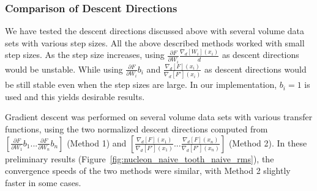 \subsubsection{Comparison of Descent Directions}
We have tested the descent directions discussed above with several volume data sets with various step sizes.
All the above described methods worked with small step sizes. As the step size increases, using $ \frac{\partial F}{\partial W_{i}} \frac{\nabla_{d}[W_{i}](x_{i})}{d} $ as descent directions would be unstable. While using $ \frac{\partial F}{\partial W_{i}} b_{i} $ and $ \frac{ \nabla_{d}[F](x_{i}) }{ \nabla_{d}[F'](x_{i}) } $ as descent directions would be still stable even when the step sizes are large. In our implementation, $ b_{i}=1 $ is used and this yields desirable results.

Gradient descent was performed on several volume data sets with various transfer functions, using the two normalized descent directions computed from $ [ \frac{\partial F}{\partial W_{1}} b_{1} ... \frac{\partial F}{\partial W_{n}} b_{n} ] $ (Method 1)
 and 
$ [ \frac{ \nabla_{d}[F](x_{1}) }{ \nabla_{d}[F'](x_{1}) }  ... \frac{ \nabla_{d}[F](x_{n}) }{ \nabla_{d}[F'](x_{n}) } ] $ (Method 2).
In these preliminary results (Figure~\ref{fig:nucleon_naive_tooth_naive_rms}), the convergence speeds of the two methods were similar, with Method 2 slightly faster in some cases.

